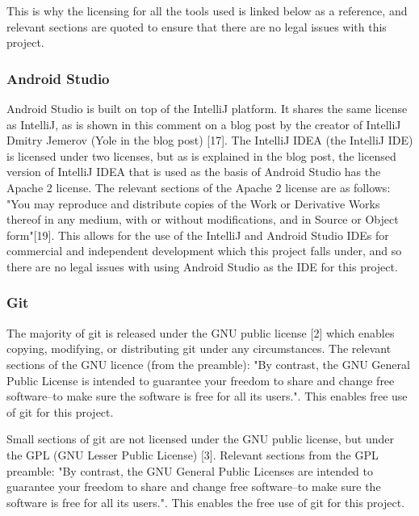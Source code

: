 \documentclass{article}
\begin{document}
This is why the licensing for all the tools used is linked below as a reference, and relevant sections are quoted to ensure that there are no legal issues with this project. \par

\subsubsection{Android Studio}

Android Studio is built on top of the IntelliJ platform. It shares the same license as IntelliJ, as is shown in this comment on a blog post by the creator of IntelliJ Dmitry Jemerov (Yole in the blog post) [17]. The IntelliJ IDEA (the IntelliJ IDE) is licensed under two licenses, but as is explained in the blog post, the licensed version of IntelliJ IDEA that is used as the basis of Android Studio has the Apache 2 license. The relevant sections of the Apache 2 license are as follows: "You may reproduce and distribute copies of the Work or Derivative Works thereof in any medium, with or without modifications, and in Source or Object form"[19]. This allows for the use of the IntelliJ and Android Studio IDEs for commercial and independent development which this project falls under, and so there are no legal issues with using Android Studio as the IDE for this project. \par

\subsubsection{Git}

The majority of git is released under the GNU public license [2] which enables copying, modifying, or distributing git under any circumstances. The relevant sections of the GNU licence (from the preamble): "By contrast, the GNU General Public License is intended to guarantee your freedom to share and change free software--to make sure the software is free for all its users.". This enables free use of git for this project. \par

Small sections of git are not licensed under the GNU public license, but under the GPL (GNU Lesser Public License) [3]. Relevant sections from the GPL preamble: "By contrast, the GNU General Public Licenses are intended to guarantee your freedom to share and change free software--to make sure the software is free for all its users.". This enables the free use of git for this project. \par
\end{document}
